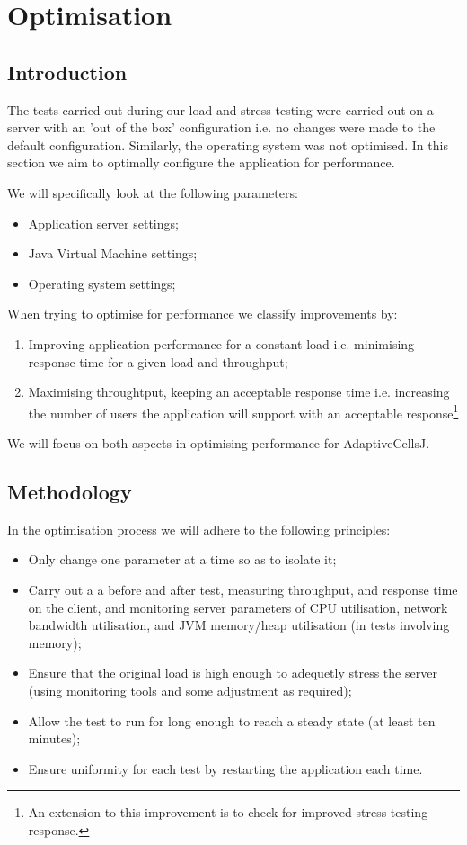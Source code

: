 \chapter{Optimisation}

\section{Introduction}

The tests carried out during our load and stress testing were carried out on a server with an 'out of the box' configuration i.e. no changes were made to the default configuration. Similarly, the operating system was not optimised. In this section we aim to optimally configure the application for performance. 

We will specifically look at the following parameters:
\begin{itemize}
 \item Application server settings;
 \item Java Virtual Machine settings;
 \item Operating system settings;
\end{itemize}

When trying to optimise for performance we classify improvements by:
\begin{enumerate}
 \item Improving application performance for a constant load i.e. minimising response time for a given load and throughput;
 \item Maximising throughtput, keeping an acceptable response time i.e. increasing the number of users the application will support with an acceptable response\footnote{An extension to this improvement is to check for improved stress testing response.}
\end{enumerate}

We will focus on both aspects in optimising performance for AdaptiveCellsJ.

\section{Methodology}

In the optimisation process we will adhere to the following principles:
\begin{itemize}
 \item Only change one parameter at a time so as to isolate it;
 \item Carry out a a before and after test, measuring throughput, and response time on the client, and monitoring server parameters of CPU utilisation, network bandwidth utilisation, and JVM memory/heap utilisation (in tests involving memory);
 \item Ensure that the original load is high enough to adequetly stress the server (using monitoring tools and some adjustment as required);
 \item Allow the test to run for long enough to reach a steady state (at least ten minutes);
 \item Ensure uniformity for each test by restarting the application each time.
\end{itemize}


